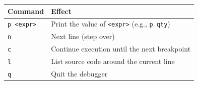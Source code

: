 \documentclass[11pt]{article}
\begin{document}
\begin{center}
\begin{tabular}{ll}
\toprule
Command & Effect \\
\midrule
\texttt{p <expr>} & Print the value of \texttt{<expr>} (e.g., \texttt{p qty}) \\
\texttt{n} & Next line (step over) \\
\texttt{c} & Continue execution until the next breakpoint \\
\texttt{l} & List source code around the current line \\
\texttt{q} & Quit the debugger \\
\bottomrule
\end{tabular}
\end{center}
\end{document}
